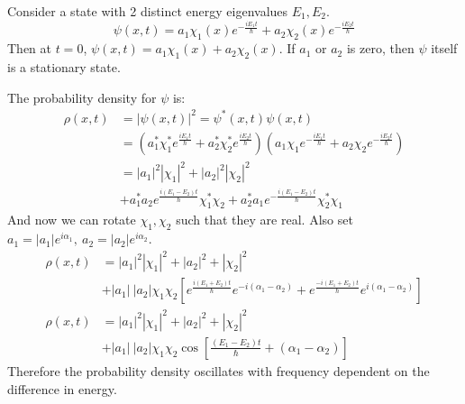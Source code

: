 \documentclass[../Main.tex]{subfiles}
\begin{document}
\begin{example}
    Consider a state with 2 distinct energy eigenvalues $E_1, E_2$.
    \begin{equation*}
        \psi(x, t) = a_1 \chi_1(x) e^{-\frac{iE_1t}{\hbar}} + a_2 \chi_2(x) e^{-\frac{iE_2t}{\hbar}}
    \end{equation*}
    Then at $t = 0$, $\psi(x, t) = a_1 \chi_1(x) + a_2 \chi_2(x)$. If $a_1$ or $a_2$ is zero, then $\psi$ itself is a stationary state.

    The probability density for $\psi$ is:
    \begin{align*}
        \rho(x, t) &= |\psi(x, t)|^2 = \psi^*(x, t) \psi(x, t) \\
        &= (a_1^* \chi_1^* e^{\frac{iE_1t}{\hbar}} + a_2^* \chi_2^* e^{\frac{iE_2t}{\hbar}})(a_1 \chi_1 e^{-\frac{iE_1t}{\hbar}} + a_2 \chi_2 e^{-\frac{iE_2t}{\hbar}}) \\
        &= |a_1|^2|\chi_1|^2 + |a_2|^2|\chi_2|^2 \\
        &+ a_1^*a_2e^{\frac{i(E_1-E_2)t}{\hbar}} \chi_1^*\chi_2 + a_2^*a_1e^{-\frac{i(E_1-E_2)t}{\hbar}} \chi_2^*\chi_1
    \end{align*}
    And now we can rotate $\chi_1, \chi_2$ such that they are real. Also set $a_1 = |a_1|e^{i\alpha_1},~a_2 = |a_2|e^{i\alpha_2}$.
    \begin{align*}
        \rho(x, t) &= |a_1|^2|\chi_1|^2 + |a_2|^2 + |\chi_2|^2 \\
        &+|a_1|~|a_2|\chi_1 \chi_2 \left[e^{\frac{i(E_1 + E_2)t}{\hbar}}e^{-i(\alpha_1 - \alpha_2)} + e^{\frac{-i(E_1 + E_2)t}{\hbar}}e^{i(\alpha_1 - \alpha_2)}\right] \\
        \rho(x, t) &= |a_1|^2|\chi_1|^2 + |a_2|^2 + |\chi_2|^2 \\
        &+|a_1|~|a_2|\chi_1 \chi_2 \cos\left[\frac{(E_1 - E_2)t}{\hbar} + (\alpha_1 - \alpha_2)\right]
    \end{align*}
    Therefore the probability density oscillates with frequency dependent on the difference in energy.
\end{example}
\end{document}
